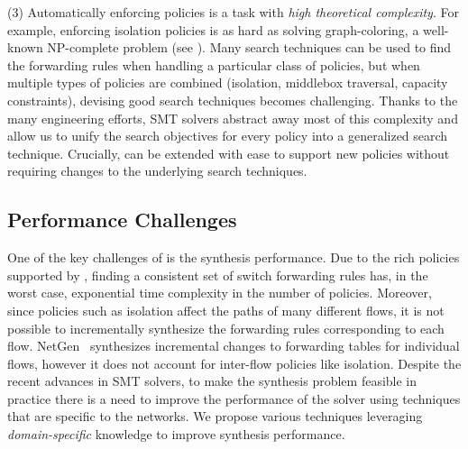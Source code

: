 (3) Automatically enforcing policies is a task with
\emph{high theoretical complexity}. 
For example, enforcing isolation policies
is as hard as solving
graph-coloring, a well-known
NP-complete problem (see ).
Many search techniques can be used to find the forwarding rules when
handling a particular class of policies, but when multiple types of
policies are combined (isolation, middlebox traversal, capacity
constraints), devising good search techniques becomes challenging.
Thanks to the many engineering efforts, SMT solvers abstract away most
of this complexity and allow us to unify the search objectives for
every policy into a generalized search technique.
Crucially, \Name can be extended with ease to
support new policies without requiring changes to the underlying search
techniques.

\subsection{Performance Challenges} \label{sec:performance}

One of the key challenges of \Name is the synthesis
performance. 
Due to the rich policies supported by \Name,
finding a consistent set of switch forwarding rules 
has, in the worst case, exponential time complexity in
the number of policies.
Moreover, since policies such as isolation affect
the paths of many different flows, it is not possible to incrementally synthesize
the forwarding rules corresponding to each flow. NetGen~\cite{netgen}
synthesizes incremental changes to forwarding tables for individual
flows, however 
it does not account for inter-flow policies like isolation.
Despite the recent advances in SMT solvers, to make
the synthesis problem feasible in practice
there is a need to improve the performance of the solver
using techniques that are specific to the networks.
We propose various techniques leveraging
\emph{domain-specific} knowledge to improve synthesis performance. 

